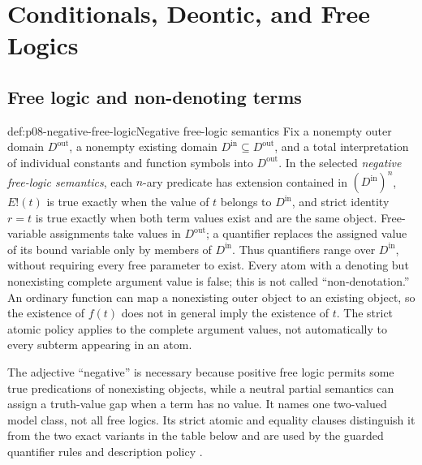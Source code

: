 \chapter{Conditionals, Deontic, and Free Logics}
\label{sec:p08-conditionals-deontic-free}

\section{Free logic and non-denoting terms}

\begin{hbdefinition}{def:p08-negative-free-logic}{Negative free-logic semantics}
Fix a nonempty outer domain \(D^{\mathrm{out}}\), a nonempty existing domain
\(D^{\mathrm{in}}\subseteq D^{\mathrm{out}}\), and a total interpretation of
individual constants and function symbols into \(D^{\mathrm{out}}\).  In the
selected \emph{negative free-logic semantics}, each \(n\)-ary predicate has
extension contained in \((D^{\mathrm{in}})^n\),
\(E!(t)\) is true exactly when the value of \(t\) belongs to
\(D^{\mathrm{in}}\), and strict identity \(r=t\) is true exactly when both
term values exist and are the same object. Free-variable assignments take
values in \(D^{\mathrm{out}}\); a quantifier replaces the assigned value of
its bound variable only by members of \(D^{\mathrm{in}}\). Thus quantifiers
range over \(D^{\mathrm{in}}\), without requiring every free parameter to
exist. Every atom with a denoting but nonexisting complete argument value
is false; this is not called ``non-denotation.'' An ordinary function can
map a nonexisting outer object to an existing object, so the existence of
\(f(t)\) does not in general imply the existence of \(t\). The strict
atomic policy applies to the complete argument values, not automatically
to every subterm appearing in an atom.

The adjective ``negative'' is necessary because positive free logic permits
some true predications of nonexisting objects, while a neutral partial
semantics can assign a truth-value gap when a term has no value.  It names one
two-valued model class, not all free logics.  Its strict atomic and equality
clauses distinguish it from the two exact variants in the table below and are
used by the guarded quantifier rules and description policy
\cite{Lambert1967,Bencivenga1986}.
\end{hbdefinition}

